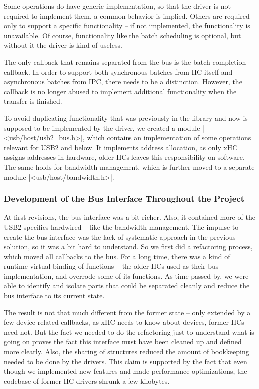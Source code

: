 Some operations do have generic implementation, so that the driver is not
required to implement them, a common behavior is implied. Others are required
only to support a specific functionality -- if not implemented, the
functionality is unavailable. Of course, functionality like the batch
scheduling is optional, but without it the driver is kind of useless.

The only callback that remains separated from the bus is the batch completion
callback. In order to support both synchronous batches from HC itself and
asynchronous batches from IPC, there needs to be a distinction. However, the
callback is no longer abused to implement additional functionality when the
transfer is finished.

To avoid duplicating functionality that was previously in the library and now is
supposed to be implemented by the driver, we created a module
\header|<usb/host/usb2_bus.h>|, which contains an implementation of some
operations relevant for USB2 and below. It implements address allocation, as
only xHC assigns addresses in hardware, older HCs leaves this responsibility on
software. The same holds for bandwidth management, which is further moved to
a separate module \header|<usb/host/bandwidth.h>|.

\subsubsection{Development of the Bus Interface Throughout the Project}

At first revisions, the bus interface was a bit richer. Also, it contained more
of the USB2 specifics hardwired -- like the bandwidth management. The impulse
to create the bus interface was the lack of systematic approach in the previous
solution, so it was a bit hard to understand. So we first did a refactoring
process, which moved all callbacks to the bus. For a long time, there was
a kind of runtime virtual binding of functions -- the older HCs used
 as their bus implementation, and overrode some of its
functions. As time passed by, we were able to identify and isolate parts that
could be separated cleanly and reduce the bus interface to its current state.

The result is not that much different from the former state -- only extended by
a few device-related callbacks, as xHC needs to know about devices, former HCs
need not. But the fact we needed to do the refactoring just to understand what
is going on proves the fact this interface must have been cleaned up and
defined more clearly. Also, the sharing of structures reduced the amount of
bookkeeping needed to be done by the drivers. This claim is supported by the
fact that even though we implemented new features and made performance
optimizations, the codebase of former HC drivers shrunk a few kilobytes.
